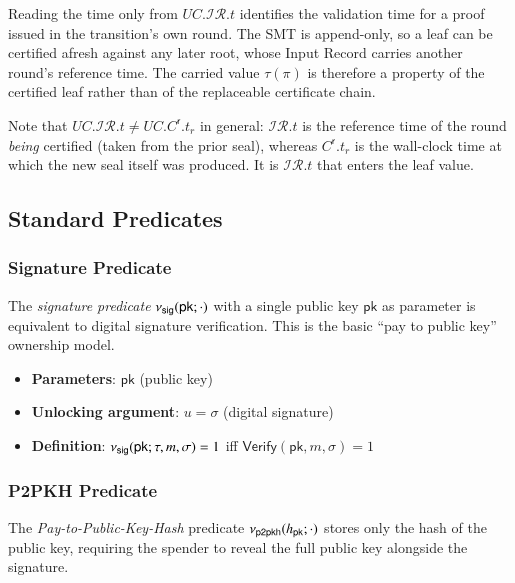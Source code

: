 Reading the time only from $UC.\mathcal{IR}.t$ identifies the validation time for a proof issued in the transition's own round. The SMT is append-only, so a leaf can be certified afresh against any later root, whose Input Record carries another round's reference time. The carried value $\tau(\pi)$ is therefore a property of the certified leaf rather than of the replaceable certificate chain.

Note that $UC.\mathcal{IR}.t \ne UC.C^\mathsf{r}.t_r$ in general: $\mathcal{IR}.t$ is the reference time of the round \emph{being} certified (taken from the prior seal), whereas $C^\mathsf{r}.t_r$ is the wall-clock time at which the new seal itself was produced. It is $\mathcal{IR}.t$ that enters the leaf value.

\subsection{Standard Predicates}\label{sec:standard-predicates}

\subsubsection{Signature Predicate}

The \emph{signature predicate} $\nu_\mathsf{sig}(\mathsf{pk};\cdot)$ with a single public key $\mathsf{pk}$ as parameter is equivalent to digital signature verification. This is the basic ``pay to public key'' ownership model.

\begin{itemize}
	\item \textbf{Parameters}: $\mathsf{pk}$ (public key)
	\item \textbf{Unlocking argument}: $u = \sigma$ (digital signature)
	\item \textbf{Definition}: $\nu_\mathsf{sig}(\mathsf{pk}; \tau, m, \sigma) = 1$ iff $\mathsf{Verify}(\mathsf{pk}, m, \sigma) = 1$
\end{itemize}

\subsubsection{P2PKH Predicate}

The \emph{Pay-to-Public-Key-Hash} predicate $\nu_\mathsf{p2pkh}(h_\mathsf{pk};\cdot)$ stores only the hash of the public key, requiring the spender to reveal the full public key alongside the signature.

